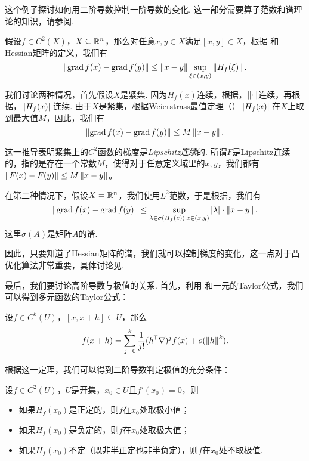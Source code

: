 \begin{example}\label{ex:lagrange-finite-multi}
这个例子探讨如何用二阶导数控制一阶导数的变化. 这一部分需要算子范数和谱理论的知识，请参阅. 

假设$f\in C^2(X)$，$X\subseteq\mathbb{R}^n$，那么对任意$x,y\in X$满足$[x,y]\in X$，根据 和Hessian矩阵的定义，我们有
\[\left\|\operatorname*{grad} f(x)-\operatorname*{grad} f(y)\right\|\leq \left\|x-y\right\|\sup_{\xi\in(x,y)}\left\|H_f(\xi)\right\|.\]

我们讨论两种情况，首先假设$X$是紧集. 因为$H_f(x)$连续，根据，$\left\|\cdot\right\|$连续，再根据，$\left\|H_f(x)\right\|$连续. 由于$X$是紧集，根据Weierstrass最值定理（）$\left\|H_f(x)\right\|$在$X$上取到最大值$M$，因此，我们有
\[\left\|\operatorname*{grad} f(x)-\operatorname*{grad} f(y)\right\|\leq M\left\|x-y\right\|.\]

这一推导表明紧集上的$C^2$函数的梯度是\emph{Lipschitz连续}的. 所谓$F$是Lipschitz连续的，指的是存在一个常数$M$，使得对于任意定义域里的$x,y$，我们都有$\left\|F(x)-F(y)\right\|\leq M\left\|x-y\right\|$。

在第二种情况下，假设$X=\mathbb{R}^n$，我们使用$L^2$范数，于是根据，我们有
\[\left\|\operatorname*{grad} f(x)-\operatorname*{grad} f(y)\right\|\leq\sup_{\lambda\in\sigma(H_f(z)),z\in(x,y)}|\lambda|\cdot \left\|x-y\right\|.\]
这里$\sigma(A)$是矩阵$A$的谱. 

因此，只要知道了Hessian矩阵的谱，我们就可以控制梯度的变化，这一点对于凸优化算法非常重要，具体讨论见.
\end{example}

最后，我们要讨论高阶导数与极值的关系. 首先，利用 和一元的Taylor公式，我们可以得到多元函数的Taylor公式：

\begin{theorem}[Taylor展开]
    设$f\in C^k(U)$，$[x,x+h]\subseteq U$，那么
    \[
        f(x+h)=\sum_{j=0}^k\frac{1}{j!}(h^{\mathsf{T}}\nabla)^jf(x)+o(\left\|h\right\|^k).
    \]
\end{theorem}

根据这一定理，我们可以得到二阶导数判定极值的充分条件：

\begin{theorem}\label{thm:second-derivative-test}
    设$f\in C^2(U)$，$U$是开集，$x_0\in U$且$f'(x_0)=0$，则
    \begin{itemize}
        \item 如果$H_f(x_0)$是正定的，则$f$在$x_0$处取极小值；
        \item 如果$H_f(x_0)$是负定的，则$f$在$x_0$处取极大值；
        \item 如果$H_f(x_0)$不定（既非半正定也非半负定），则$f$在$x_0$处不取极值.
    \end{itemize}
\end{theorem}


